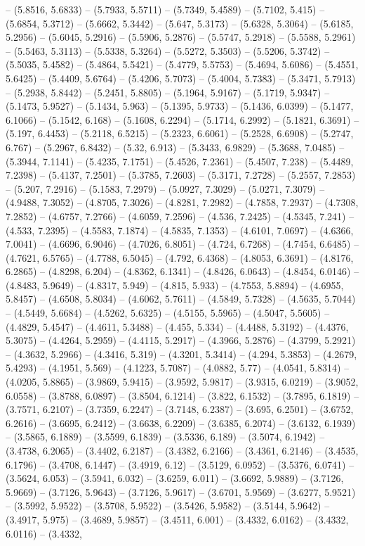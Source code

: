 -- (5.8516, 5.6833) -- (5.7933, 5.5711) -- (5.7349, 5.4589) -- (5.7102, 5.415) -- (5.6854, 5.3712) -- (5.6662, 5.3442) -- (5.647, 5.3173) -- (5.6328, 5.3064) -- (5.6185, 5.2956) -- (5.6045, 5.2916) -- (5.5906, 5.2876) -- (5.5747, 5.2918) -- (5.5588, 5.2961) -- (5.5463, 5.3113) -- (5.5338, 5.3264) -- (5.5272, 5.3503) -- (5.5206, 5.3742) -- (5.5035, 5.4582) -- (5.4864, 5.5421) -- (5.4779, 5.5753) -- (5.4694, 5.6086) -- (5.4551, 5.6425) -- (5.4409, 5.6764) -- (5.4206, 5.7073) -- (5.4004, 5.7383) -- (5.3471, 5.7913) -- (5.2938, 5.8442) -- (5.2451, 5.8805) -- (5.1964, 5.9167) -- (5.1719, 5.9347) -- (5.1473, 5.9527) -- (5.1434, 5.963) -- (5.1395, 5.9733) -- (5.1436, 6.0399) -- (5.1477, 6.1066) -- (5.1542, 6.168) -- (5.1608, 6.2294) -- (5.1714, 6.2992) -- (5.1821, 6.3691) -- (5.197, 6.4453) -- (5.2118, 6.5215) -- (5.2323, 6.6061) -- (5.2528, 6.6908) -- (5.2747, 6.767) -- (5.2967, 6.8432) -- (5.32, 6.913) -- (5.3433, 6.9829) -- (5.3688, 7.0485) -- (5.3944, 7.1141) -- (5.4235, 7.1751) -- (5.4526, 7.2361) -- (5.4507, 7.238) -- (5.4489, 7.2398) -- (5.4137, 7.2501) -- (5.3785, 7.2603) -- (5.3171, 7.2728) -- (5.2557, 7.2853) -- (5.207, 7.2916) -- (5.1583, 7.2979) -- (5.0927, 7.3029) -- (5.0271, 7.3079) -- (4.9488, 7.3052) -- (4.8705, 7.3026) -- (4.8281, 7.2982) -- (4.7858, 7.2937) -- (4.7308, 7.2852) -- (4.6757, 7.2766) -- (4.6059, 7.2596) -- (4.536, 7.2425) -- (4.5345, 7.241) -- (4.533, 7.2395) -- (4.5583, 7.1874) -- (4.5835, 7.1353) -- (4.6101, 7.0697) -- (4.6366, 7.0041) -- (4.6696, 6.9046) -- (4.7026, 6.8051) -- (4.724, 6.7268) -- (4.7454, 6.6485) -- (4.7621, 6.5765) -- (4.7788, 6.5045) -- (4.792, 6.4368) -- (4.8053, 6.3691) -- (4.8176, 6.2865) -- (4.8298, 6.204) -- (4.8362, 6.1341) -- (4.8426, 6.0643) -- (4.8454, 6.0146) -- (4.8483, 5.9649) -- (4.8317, 5.949) -- (4.815, 5.933) -- (4.7553, 5.8894) -- (4.6955, 5.8457) -- (4.6508, 5.8034) -- (4.6062, 5.7611) -- (4.5849, 5.7328) -- (4.5635, 5.7044) -- (4.5449, 5.6684) -- (4.5262, 5.6325) -- (4.5155, 5.5965) -- (4.5047, 5.5605) -- (4.4829, 5.4547) -- (4.4611, 5.3488) -- (4.455, 5.334) -- (4.4488, 5.3192) -- (4.4376, 5.3075) -- (4.4264, 5.2959) -- (4.4115, 5.2917) -- (4.3966, 5.2876) -- (4.3799, 5.2921) -- (4.3632, 5.2966) -- (4.3416, 5.319) -- (4.3201, 5.3414) -- (4.294, 5.3853) -- (4.2679, 5.4293) -- (4.1951, 5.569) -- (4.1223, 5.7087) -- (4.0882, 5.77) -- (4.0541, 5.8314) -- (4.0205, 5.8865) -- (3.9869, 5.9415) -- (3.9592, 5.9817) -- (3.9315, 6.0219) -- (3.9052, 6.0558) -- (3.8788, 6.0897) -- (3.8504, 6.1214) -- (3.822, 6.1532) -- (3.7895, 6.1819) -- (3.7571, 6.2107) -- (3.7359, 6.2247) -- (3.7148, 6.2387) -- (3.695, 6.2501) -- (3.6752, 6.2616) -- (3.6695, 6.2412) -- (3.6638, 6.2209) -- (3.6385, 6.2074) -- (3.6132, 6.1939) -- (3.5865, 6.1889) -- (3.5599, 6.1839) -- (3.5336, 6.189) -- (3.5074, 6.1942) -- (3.4738, 6.2065) -- (3.4402, 6.2187) -- (3.4382, 6.2166) -- (3.4361, 6.2146) -- (3.4535, 6.1796) -- (3.4708, 6.1447) -- (3.4919, 6.12) -- (3.5129, 6.0952) -- (3.5376, 6.0741) -- (3.5624, 6.053) -- (3.5941, 6.032) -- (3.6259, 6.011) -- (3.6692, 5.9889) -- (3.7126, 5.9669) -- (3.7126, 5.9643) -- (3.7126, 5.9617) -- (3.6701, 5.9569) -- (3.6277, 5.9521) -- (3.5992, 5.9522) -- (3.5708, 5.9522) -- (3.5426, 5.9582) -- (3.5144, 5.9642) -- (3.4917, 5.975) -- (3.4689, 5.9857) -- (3.4511, 6.001) -- (3.4332, 6.0162) -- (3.4332, 6.0116) -- (3.4332, 